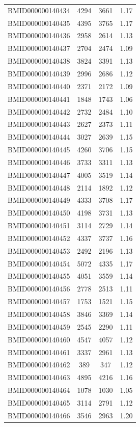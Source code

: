 \documentclass{bmcart}
\begin{document}
\begin{backmatter}
\begin{center}
\begin{longtable}{c|c|c|c}
BMID000000140434 & 4294 & 3661 & 1.17 \\
BMID000000140435 & 4395 & 3765 & 1.17 \\
BMID000000140436 & 2958 & 2614 & 1.13 \\
BMID000000140437 & 2704 & 2474 & 1.09 \\
BMID000000140438 & 3824 & 3391 & 1.13 \\
BMID000000140439 & 2996 & 2686 & 1.12 \\
BMID000000140440 & 2371 & 2172 & 1.09 \\
BMID000000140441 & 1848 & 1743 & 1.06 \\
BMID000000140442 & 2732 & 2484 & 1.10\\
BMID000000140443 & 2627 & 2373 & 1.11 \\
BMID000000140444 & 3027 & 2639 & 1.15 \\
BMID000000140445 & 4260 & 3706 & 1.15 \\
BMID000000140446 & 3733 & 3311 & 1.13 \\
BMID000000140447 & 4005 & 3519 & 1.14 \\
BMID000000140448 & 2114 & 1892 & 1.12 \\
BMID000000140449 & 4333 & 3708 & 1.17 \\
BMID000000140450 & 4198 & 3731 & 1.13 \\
BMID000000140451 & 3114 & 2729 & 1.14 \\
BMID000000140452 & 4337 & 3737 & 1.16 \\
BMID000000140453 & 2492 & 2196 & 1.13 \\
BMID000000140454 & 5072 & 4335 & 1.17 \\
BMID000000140455 & 4051 & 3559 & 1.14 \\
BMID000000140456 & 2778 & 2513 & 1.11 \\
BMID000000140457 & 1753 & 1521 & 1.15 \\
BMID000000140458 & 3846 & 3369 & 1.14 \\
BMID000000140459 & 2545 & 2290 & 1.11 \\
BMID000000140460 & 4547 & 4057 & 1.12 \\
BMID000000140461 & 3337 & 2961 & 1.13 \\
BMID000000140462 & 389 & 347 & 1.12 \\
BMID000000140463 & 4895 & 4216 & 1.16 \\
BMID000000140464 & 1078 & 1030 & 1.05 \\
BMID000000140465 & 3114 & 2791 & 1.12 \\
BMID000000140466 & 3546 & 2963 & 1.20\\

\end{longtable}
\end{center}
\end{backmatter}
\end{document}
